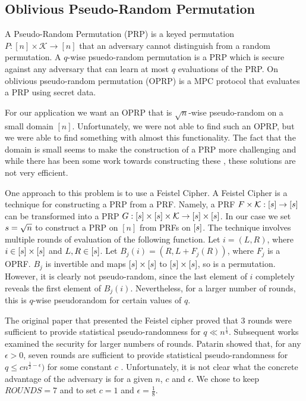 \subsection{Oblivious Pseudo-Random Permutation}

A Pseudo-Random Permutation (PRP) is a keyed permutation
$P : [n] \times \mathcal{K} \rightarrow [n]$
that an adversary cannot distinguish from a random permutation.
A $q$-wise psuedo-random permutation is a PRP which is secure against
any adversary that can learn at most $q$ evaluations of the PRP.
On oblivious pseudo-random permutation (OPRP) is a MPC protocol
that evaluates a PRP using secret data.

For our application we want an OPRP that is $\sqrt{n}$-wise pseudo-random
on a small domain $[n]$. 
Unfortunately, we were not able to find such an OPRP, but we were able
to find something with almost this functionality.
The fact that the domain is small seems to make the construction of a PRP
more challenging and while there has been some work towards constructing these
\cite{black2002ciphers, morris2009encipher, stefanov2012fastprp},
these solutions are not very efficient.

One approach to this problem is to use a Feistel Cipher.
A Feistel Cipher is a technique for constructing a PRP from a PRF.
Namely, a PRF $F \times \mathcal{K} : [s] \rightarrow [s]$ 
can be transformed into a PRP 
$G : [s] \times [s] \times \mathcal{K} \rightarrow [s] \times [s]$. 
In our case we set $s = \sqrt{n}$ to construct a PRP on 
$[n]$ from PRFs on $[s]$.
The technique involves multiple rounds of evaluation of the following function.
Let $i = (L, R)$, where $i \in [s] \times [s]$ and $L, R \in [s]$.
Let $B_j(i) = (R, L + F_j(R))$, where $F_j$ is a OPRF.
$B_j$ is invertible and maps $[s] \times [s]$ to $[s] \times [s]$, 
so is a permutation.
However, it is clearly not pseudo-random, since the last element of $i$ 
completely reveals the first element of $B_j(i)$.
Nevertheless, for a larger number of rounds, this is $q$-wise 
pseudorandom for certain values of $q$.

The original paper that presented the Feistel cipher \cite{luby1988construct}
proved that 3 rounds were sufficient to provide statistical pseudo-randomness
for $q \ll n^{\frac{1}{4}}$.
Subsequent works examined the security for larger numbers of rounds.
Patarin showed that, for any $\epsilon > 0$,
seven rounds are sufficient to provide statistical pseudo-randomness for 
$q \leq c n^{\frac{1}{2} - \epsilon})$ for some constant $c$ 
\cite{patarin2003luby}.
Unfortunately, it is not clear what the concrete advantage of the
adversary is for a given $n$, $c$ and $\epsilon$.
We chose to keep $ROUNDS=7$ and to set $c=1$ and $\epsilon = \frac{1}{8}$.

